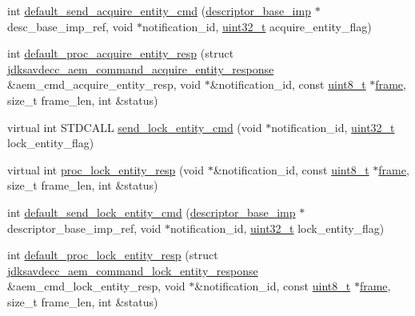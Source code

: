 \begin{DoxyCompactItemize}
\item 
int \hyperlink{classavdecc__lib_1_1descriptor__base__imp_a4ee5f42b89a728627bf1340afebc7c82}{default\+\_\+send\+\_\+acquire\+\_\+entity\+\_\+cmd} (\hyperlink{classavdecc__lib_1_1descriptor__base__imp}{descriptor\+\_\+base\+\_\+imp} $\ast$desc\+\_\+base\+\_\+imp\+\_\+ref, void $\ast$notification\+\_\+id, \hyperlink{parse_8c_a6eb1e68cc391dd753bc8ce896dbb8315}{uint32\+\_\+t} acquire\+\_\+entity\+\_\+flag)
\item 
int \hyperlink{classavdecc__lib_1_1descriptor__base__imp_ad248d7d7060e28eb36c8dc37d2653c43}{default\+\_\+proc\+\_\+acquire\+\_\+entity\+\_\+resp} (struct \hyperlink{structjdksavdecc__aem__command__acquire__entity__response}{jdksavdecc\+\_\+aem\+\_\+command\+\_\+acquire\+\_\+entity\+\_\+response} \&aem\+\_\+cmd\+\_\+acquire\+\_\+entity\+\_\+resp, void $\ast$\&notification\+\_\+id, const \hyperlink{stdint_8h_aba7bc1797add20fe3efdf37ced1182c5}{uint8\+\_\+t} $\ast$\hyperlink{gst__avb__playbin_8c_ac8e710e0b5e994c0545d75d69868c6f0}{frame}, size\+\_\+t frame\+\_\+len, int \&status)
\item 
virtual int S\+T\+D\+C\+A\+LL \hyperlink{classavdecc__lib_1_1descriptor__base__imp_a26fd66d8c409502eaa4dba47742ca7fa}{send\+\_\+lock\+\_\+entity\+\_\+cmd} (void $\ast$notification\+\_\+id, \hyperlink{parse_8c_a6eb1e68cc391dd753bc8ce896dbb8315}{uint32\+\_\+t} lock\+\_\+entity\+\_\+flag)
\item 
virtual int \hyperlink{classavdecc__lib_1_1descriptor__base__imp_a6cd2b73ea95b18f07dbdc251140679b0}{proc\+\_\+lock\+\_\+entity\+\_\+resp} (void $\ast$\&notification\+\_\+id, const \hyperlink{stdint_8h_aba7bc1797add20fe3efdf37ced1182c5}{uint8\+\_\+t} $\ast$\hyperlink{gst__avb__playbin_8c_ac8e710e0b5e994c0545d75d69868c6f0}{frame}, size\+\_\+t frame\+\_\+len, int \&status)
\item 
int \hyperlink{classavdecc__lib_1_1descriptor__base__imp_af40ac09b84feb7551bf0389a2a5db4ca}{default\+\_\+send\+\_\+lock\+\_\+entity\+\_\+cmd} (\hyperlink{classavdecc__lib_1_1descriptor__base__imp}{descriptor\+\_\+base\+\_\+imp} $\ast$descriptor\+\_\+base\+\_\+imp\+\_\+ref, void $\ast$notification\+\_\+id, \hyperlink{parse_8c_a6eb1e68cc391dd753bc8ce896dbb8315}{uint32\+\_\+t} lock\+\_\+entity\+\_\+flag)
\item 
int \hyperlink{classavdecc__lib_1_1descriptor__base__imp_a3b3582020613e7f60efe96567679be7f}{default\+\_\+proc\+\_\+lock\+\_\+entity\+\_\+resp} (struct \hyperlink{structjdksavdecc__aem__command__lock__entity__response}{jdksavdecc\+\_\+aem\+\_\+command\+\_\+lock\+\_\+entity\+\_\+response} \&aem\+\_\+cmd\+\_\+lock\+\_\+entity\+\_\+resp, void $\ast$\&notification\+\_\+id, const \hyperlink{stdint_8h_aba7bc1797add20fe3efdf37ced1182c5}{uint8\+\_\+t} $\ast$\hyperlink{gst__avb__playbin_8c_ac8e710e0b5e994c0545d75d69868c6f0}{frame}, size\+\_\+t frame\+\_\+len, int \&status)

\end{DoxyCompactItemize}

